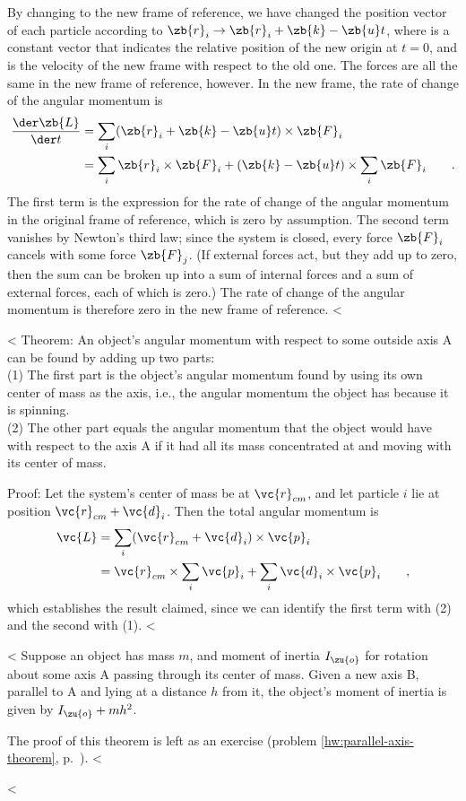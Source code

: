 By changing to the new frame of reference, we have changed
the position vector of each particle according to $\zb{r}_i \rightarrow \zb{r}_i+\zb{k}-\zb{u}t$,
where  is a constant vector that indicates the relative position of the new
origin at $t=0$, and  is the velocity of the new frame with respect to the old one.
The forces are all the same in the new frame of reference, however.
In the new frame, the rate of change of the angular momentum is
\begin{align*}
		\frac{\der\zb{L}}{\der t}	&= \sum_i
				(\zb{r}_i+\zb{k}-\zb{u}t)\times\zb{F}_i \\
		&= \sum_i \zb{r}_i\times\zb{F}_i
			+ (\zb{k}-\zb{u}t) \times \sum_i \zb{F}_i \qquad .
\end{align*}
The first term is the expression for the rate of change of the angular
momentum in the original frame of reference, which is zero by
assumption. The second term vanishes by Newton's third law; since the system is
closed, every force $\zb{F}_i$ cancels with some force $\zb{F}_j$.
(If external forces act, but they add up to zero, then the sum can be
broken up into a sum of internal forces and a sum of external forces, each of
which is zero.)
The rate of change of the angular momentum is therefore zero
in the new frame of reference.
<%

<%
Theorem: An object's angular momentum with respect to some outside
axis A can be found by adding up two parts:\\
(1) The first part is the object's angular momentum
found by using its own center of mass as the axis, i.e., the
angular momentum the object has because it is spinning.\\
(2) The other part equals the angular momentum that the object
would have with respect to the axis A if it had all its mass
concentrated at and moving with its center of mass.

Proof: Let the system's center of mass be at  $\vc{r}_{cm}$, and let particle $i$ lie at position $\vc{r}_{cm}+\vc{d}_i$.
Then the total angular momentum is
\begin{align*}
  \vc{L} &= \sum_i (\vc{r}_{cm}+\vc{d}_i)\times\vc{p}_i \\
         &= \vc{r}_{cm}\times\sum_i \vc{p}_i+\sum_i \vc{d}_i\times\vc{p}_i \qquad ,
\end{align*}
which establishes the result claimed, since we can identify the first term with (2)
and the second with (1).
<%

<%
Suppose an object has mass $m$, and moment of inertia $I_\zu{o}$ for rotation about some axis A
passing through its center of mass. Given a new axis B, parallel to A and lying at a distance $h$ from
it, the object's moment of inertia is given by $I_\zu{o}+mh^2$.

The proof of this theorem is left as an exercise (problem \ref{hw:parallel-axis-theorem}, p.~\pageref{hw:parallel-axis-theorem}).
<%

<%
